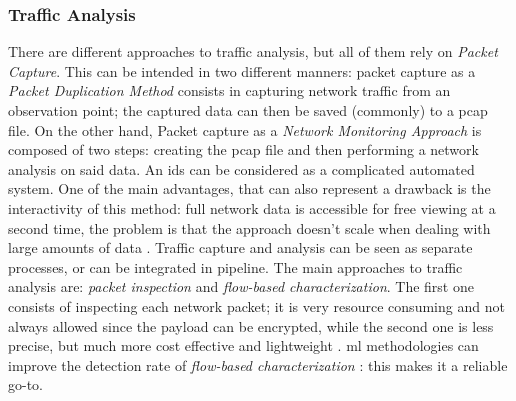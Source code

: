 \subsubsection{Traffic Analysis}
\label{subsubsec:traffic-analysis}

There are different approaches to traffic analysis, but all of them rely on \textit{Packet Capture}. This can be intended in two different manners: packet capture as a \textit{Packet Duplication Method} consists in capturing network traffic from an observation point; the captured data can then be saved (commonly) to a \gls{pcap} file. On the other hand, Packet capture as a \textit{Network Monitoring Approach} is composed of two steps: creating the \gls{pcap} file and then performing a network analysis on said data. An \gls{ids} can be considered as a complicated automated system. One of the main advantages, that can also represent a drawback is the interactivity of this method: full network data is accessible for free viewing at a second time, the problem is that the approach doesn't scale when dealing with large amounts of data \cite{Svoboda2015}. Traffic capture and analysis can be seen as separate processes, or can be integrated in pipeline. The main approaches to traffic analysis are: \textit{packet inspection} and \textit{flow-based characterization}. The first one consists of inspecting each network packet; it is very resource consuming and not always allowed since the payload can be encrypted, while the second one is less precise, but much more cost effective and lightweight \cite{Alaidaros2017}. \gls{ml} methodologies can improve the detection rate of \textit{flow-based characterization} \cite{Iglesias2015}: this makes it a reliable go-to.

